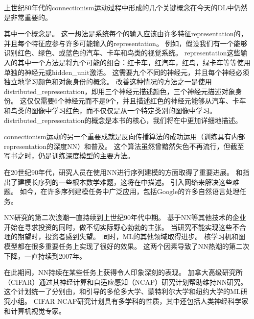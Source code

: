 上世纪80年代的\gls{connectionism}运动过程中形成的几个关键概念在今天的\gls{DL}中仍然是非常重要的。

其中一个概念是\citep{Hinton-et-al-PDP1986}。
这一想法是系统每个的输入应该由许多特征\gls{representation}的，并且每个特征应参与许多可能输入的\gls{representation}。
例如，假设我们有一个能够识别红色、绿色、或蓝色的汽车、卡车和鸟类的视觉系统。
\gls{representation}这些输入的其中一个方法是将九个可能的组合：红卡车，红汽车，红鸟，绿卡车等等使用单独的神经元或\gls{hidden_unit}激活。
这需要九个不同的神经元，并且每个神经必须独立地学习颜色和对象身份的概念。
改善这种情况的方法之一是使用\gls{distributed_representation}，即用三个神经元描述颜色，三个神经元描述对象身份。 
这仅仅需要6个神经元而不是9个，并且描述红色的神经元能够从汽车、卡车和鸟类的图像中学习红色，而不仅仅是从一个特定类别的图像中学习。 
\gls{distributed_representation}的概念是本书的核心，我们将在中更加详细地描述。


\gls{connectionism}运动的另一个重要成就是反向传播算法的成功运用（训练具有内部\gls{representation}的深度\gls{NN}）和普及\citep{RHW,Lecun-these87}。
这个算法虽然曾黯然失色不再流行，但截至写书之时，仍是训练深度模型的主要方法。%

在20世纪90年代，研究人员在使用\gls{NN}进行序列建模的方面取得了重要进展。
\citet{Hochreiter91}和\citet{Bengio1994ITNN}指出了建模长序列的一些根本数学难题，这将在中描述。
\citet{Hochreiter+Schmidhuber-1997}引入网络来解决这些难题。
如今，在许多序列建模任务中广泛应用，包括Google的许多自然语言处理任务。

\gls{NN}研究的第二次浪潮一直持续到上世纪90年代中期。
基于\gls{NN}等其他技术的企业开始在寻求投资的同时，做不切实际野心勃勃的主张。
当研究不能实现这些不合理的期望时，投资者感到失望。
同时，\gls{ML}的其他领域取得进步。
核学习机\citep{Boser92,Cortes95,SchBurSmo99}和图模型\citep{Jordan98}都在很多重要任务上实现了很好的效果。
这两个因素导致了\gls{NN}热潮的第二次下降，一直持续到2007年。

在此期间，\gls{NN}持续在某些任务上获得令人印象深刻的表现\citep{LeCun98-small,Bengio-nnlm2001}。
加拿大高级研究所（CIFAR）通过其神经计算和自适应感知（NCAP）研究计划帮助维持\gls{NN}研究。
这个计划统一了分别由，和引导的多伦多大学、蒙特利尔大学和纽约大学的\gls{ML}研究小组。
CIFAR NCAP研究计划具有多学科的性质，其中还包括人类神经科学家和计算机视觉专家。

